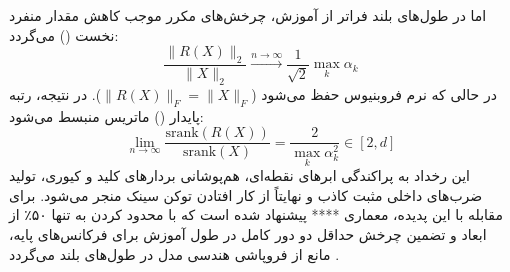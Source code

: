 اما در طول‌های بلند فراتر از آموزش، چرخش‌های مکرر  موجب کاهش مقدار منفرد نخست () می‌گردد:
\begin{equation}
    \frac{\|R(X)\|_2}{\|X\|_2} \xrightarrow{n \to \infty} \frac{1}{\sqrt{2}} \max_k \alpha_k
\end{equation}
در حالی که نرم فروبنیوس حفظ می‌شود ($\|R(X)\|_F = \|X\|_F$). در نتیجه، رتبه پایدار () ماتریس منبسط می‌شود:
\begin{equation}
    \lim_{n \to \infty} \frac{\text{srank}(R(X))}{\text{srank}(X)} = \frac{2}{\max_k \alpha_k^2} \in [2, d]
\end{equation}
این رخداد به پراکندگی ابرهای نقطه‌ای، هم‌پوشانی بردارهای کلید و کیوری، تولید ضرب‌های داخلی مثبت کاذب و نهایتاً از کار افتادن توکن سینک منجر می‌شود. برای مقابله با این پدیده، معماری **** پیشنهاد شده است که با محدود کردن  به تنها ۵۰٪ از ابعاد و تضمین چرخش حداقل دو دور کامل در طول آموزش برای فرکانس‌های پایه، مانع از فروپاشی هندسی مدل در طول‌های بلند می‌گردد \cite{wertheimer2026frayed}.

